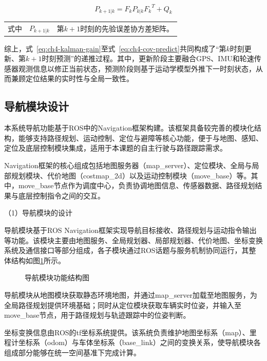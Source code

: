 \begin{equation}
\label{eq:ch4-cov-predict}
P_{k+1|k} = F_{k}P_{k|k}{F_{k}}^{T} + Q_{k}
\end{equation}
\begin{tabularx}{\textwidth}{@{}l@{\quad}r@{———}X@{}}
式中& $P_{k+1|k}$ & 第$k+1$时刻的先验误差协方差矩阵。\\
\end{tabularx}\vspace{3.15bp}

综上，式~\eqref{eq:ch4-kalman-gain}至式~\eqref{eq:ch4-cov-predict}共同构成了“第$k$时刻更新、第$k+1$时刻预测”的递推过程。其中，更新阶段主要融合GPS、IMU和轮速传感器观测信息以修正当前状态，预测阶段则基于运动学模型外推下一时刻状态，从而兼顾定位结果的实时性与全局一致性。

\subsection{导航模块设计}

本系统导航功能基于ROS中的Navigation框架构建。该框架具备较完善的模块化结构，能够支持路径规划、运动控制、定位与避障等核心功能，便于与地图、感知、定位及底层控制模块集成，适用于本课题的自主行驶与路径跟踪需求。

Navigation框架的核心组成包括地图服务器（map\_server）、定位模块、全局与局部规划模块、代价地图（costmap\_2d）以及运动控制模块（move\_base）等。其中，move\_base节点作为调度中心，负责协调地图信息、传感器数据、路径规划结果与底层控制指令之间的交互。

（1）导航模块的设计

导航模块基于ROS Navigation框架实现导航目标接收、路径规划与运动指令输出等功能。该模块主要由地图服务、全局规划器、局部规划器、代价地图、坐标变换系统及通信接口等部分组成，各子模块通过ROS话题与服务机制协同运行，其整体结构如图\ref{导航模块功能结构图}所示。

\begin{figure}[h]
\centering

\caption{导航模块功能结构图}
\label{导航模块功能结构图}
\end{figure}

导航模块从地图模块获取静态环境地图，并通过map\_server加载至地图服务，为全局路径规划提供环境基础；同时从定位模块获取车辆实时位姿，并输入至move\_base节点，用于路径规划与轨迹跟踪中的位姿判断。

坐标变换信息由ROS的tf坐标系统提供。该系统负责维护地图坐标系（map）、里程计坐标系（odom）与车体坐标系（base\_link）之间的变换关系，使导航模块各组成部分能够在统一空间基准下完成计算。

